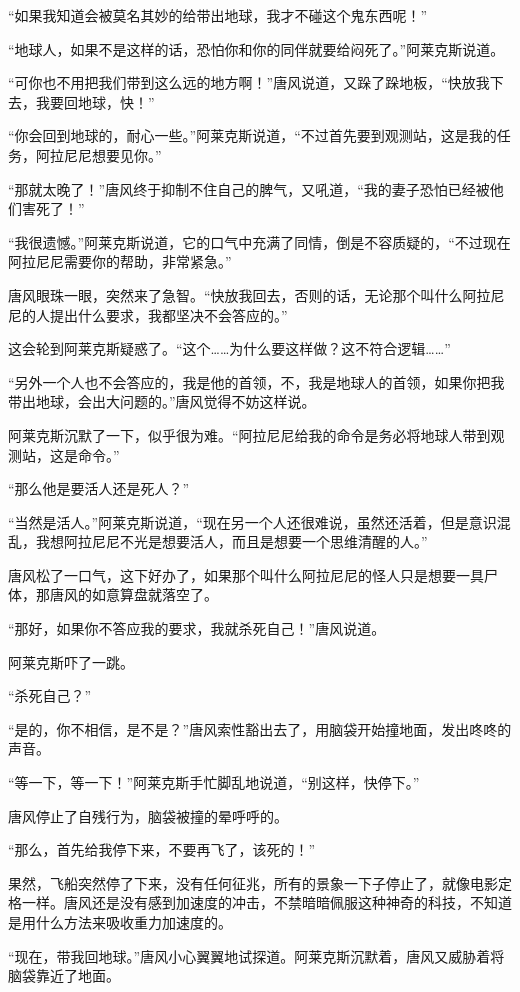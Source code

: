 “如果我知道会被莫名其妙的给带出地球，我才不碰这个鬼东西呢！”

“地球人，如果不是这样的话，恐怕你和你的同伴就要给闷死了。”阿莱克斯说道。

“可你也不用把我们带到这么远的地方啊！”唐风说道，又跺了跺地板，“快放我下去，我要回地球，快！”

“你会回到地球的，耐心一些。”阿莱克斯说道，“不过首先要到观测站，这是我的任务，阿拉尼尼想要见你。”

“那就太晚了！”唐风终于抑制不住自己的脾气，又吼道，“我的妻子恐怕已经被他们害死了！”

“我很遗憾。”阿莱克斯说道，它的口气中充满了同情，倒是不容质疑的，“不过现在阿拉尼尼需要你的帮助，非常紧急。”

唐风眼珠一眼，突然来了急智。“快放我回去，否则的话，无论那个叫什么阿拉尼尼的人提出什么要求，我都坚决不会答应的。”

这会轮到阿莱克斯疑惑了。“这个……为什么要这样做？这不符合逻辑……”

“另外一个人也不会答应的，我是他的首领，不，我是地球人的首领，如果你把我带出地球，会出大问题的。”唐风觉得不妨这样说。

阿莱克斯沉默了一下，似乎很为难。“阿拉尼尼给我的命令是务必将地球人带到观测站，这是命令。”

“那么他是要活人还是死人？”

“当然是活人。”阿莱克斯说道，“现在另一个人还很难说，虽然还活着，但是意识混乱，我想阿拉尼尼不光是想要活人，而且是想要一个思维清醒的人。”

唐风松了一口气，这下好办了，如果那个叫什么阿拉尼尼的怪人只是想要一具尸体，那唐风的如意算盘就落空了。

“那好，如果你不答应我的要求，我就杀死自己！”唐风说道。

阿莱克斯吓了一跳。

“杀死自己？”

“是的，你不相信，是不是？”唐风索性豁出去了，用脑袋开始撞地面，发出咚咚的声音。

“等一下，等一下！”阿莱克斯手忙脚乱地说道，“别这样，快停下。”

唐风停止了自残行为，脑袋被撞的晕呼呼的。

“那么，首先给我停下来，不要再飞了，该死的！”

果然，飞船突然停了下来，没有任何征兆，所有的景象一下子停止了，就像电影定格一样。唐风还是没有感到加速度的冲击，不禁暗暗佩服这种神奇的科技，不知道是用什么方法来吸收重力加速度的。

“现在，带我回地球。”唐风小心翼翼地试探道。阿莱克斯沉默着，唐风又威胁着将脑袋靠近了地面。

